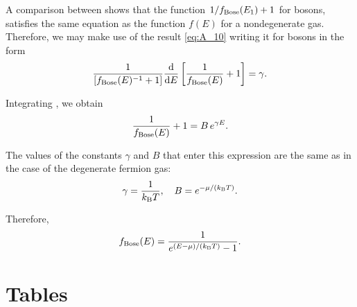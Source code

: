 \noindent
A comparison between  shows that the function $1/f_{\text{Bose}}(E_1) + 1$ for bosons, satisfies the same equation as the function $f(E)$ for a nondegenerate gas. Therefore, we may make use of the result \eqref{eq:A_10} writing it for bosons in the form
\begin{equation}\label{eq:III_5}
    \frac{1}{\left[f_{\text{Bose}}(E)^{-1} + 1\right]} \dfrac{\mathrm{d}}{\mathrm{d} E} \left[\frac{1}{f_{\text{Bose}}(E)} + 1\right] = \gamma.
\end{equation}

\noindent
Integrating , we obtain
\begin{equation}\label{eq:III_6}
    \frac{1}{f_{\text{Bose}}(E)} + 1 = B\, e^{\gamma E}.
\end{equation}

\noindent
The values of the constants $\gamma$ and $B$ that enter this expression are the same as in the case of the degenerate fermion gas:
\begin{equation}\label{eq:III_7}
    \gamma = \frac{1}{k_{\text{B}}T},\quad B = e^{-\mu/(k_{\text{B}}T)}.
\end{equation}

\noindent
Therefore,
\begin{equation}\label{eq:III_8}
    f_{\text{Bose}}(E) = \frac{1}{e^{(E-\mu) / (k_{\text{B}}T)} - 1}.
\end{equation}

\section{Tables}\label{sec:A_IV}

\begin{table}[h]
	\renewcommand{\arraystretch}{1.2}
	\caption{}
	\vspace{-0.6cm}
	\label{table:A_1}
	\begin{center}\end{center}
\end{table}

